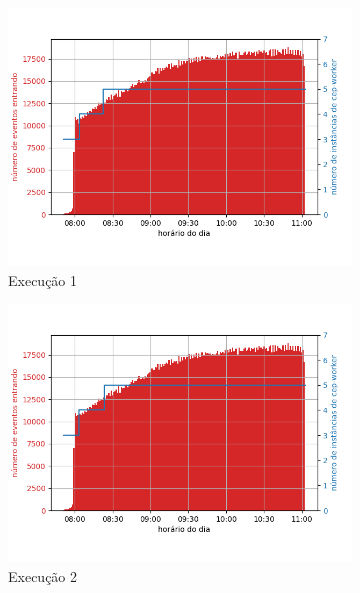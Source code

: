 \begin{figure}[h!]
\begin{subfigure}{.5\textwidth}
  \centering
  \includegraphics[width=\linewidth]{figuras/graphics/carga_e_workers_horario5-dez-su.png}  
  \caption{Execução 1}
  \label{fig:cewh-5-dez-su}
\end{subfigure}
\begin{subfigure}{.5\textwidth}
  \centering
  \includegraphics[width=\linewidth]{figuras/graphics/carga_e_workers_horario7-dez-su.png}  
  \caption{Execução 2}
  \label{fig:cewh-7-dez-su}
\end{subfigure}
\begin{subfigure}{.5\textwidth}

\end{subfigure}
\end{figure}
